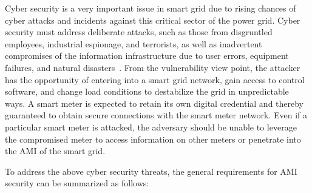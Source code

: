 Cyber security is a very important issue in smart grid due to rising chances of cyber attacks and incidents against this critical sector of the power grid. Cyber security must address deliberate attacks, such as those from disgruntled employees, industrial espionage, and terrorists, as well as inadvertent compromises of the information infrastructure due to user errors, equipment failures, and natural disasters~\cite{Yan13}. From the vulnerability view point, the attacker has the opportunity of entering into a smart grid network, gain access to control software, and change load conditions to destabilize the grid in unpredictable ways. A smart meter is expected to retain its own digital credential and thereby guaranteed to obtain secure connections with the smart meter network. Even if a particular smart meter is attacked, the adversary should be unable to leverage the compromised meter to access information on other meters or penetrate into the AMI of the smart grid.

To address the above cyber security threats, the general requirements for AMI security can be summarized as follows:

